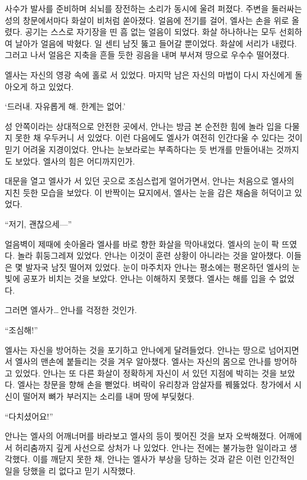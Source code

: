 사수가 발사를 준비하며 쇠뇌를 장전하는 소리가 동시에 울려 퍼졌다. 주변을 둘러싸는 성의 창문에서마다 화살이 비처럼 쏟아졌다. 얼음에 전기를 걸어, 엘사는 손을 위로 올렸다. 공기는 스스로 자기장을 띤 흠 없는 얼음이 되었다. 화살 하나하나는 모두 선회하여 날아가 얼음에 박혔다. 일 센티 남짓 뚫고 들어갈 뿐이었다. 화살에 서리가 내렸다. 그러고 나서 얼음은 지축을 흔들 듯한 굉음을 내며 부서져 땅으로 우수수 떨어졌다.

엘사는 자신의 영광 속에 홀로 서 있었다. 마지막 남은 자신의 마법이 다시 자신에게 돌아오게 하고 있었다.

`드러내. 자유롭게 해. 한계는 없어.'

\textbreak

성 안쪽이라는 상대적으로 안전한 곳에서, 안나는 방금 본 순전한 힘에 놀라 입을 다물지 못한 채 우두커니 서 있었다. 이런 다음에도 엘사가 여전히 인간다울 수 있다는 것이 믿기 어려울 지경이었다. 안나는 눈보라로는 부족하다는 듯 번개를 만들어내는 것까지도 보았다. 엘사의 힘은 어디까지인가.

대문을 열고 엘사가 서 있던 곳으로 조심스럽게 얼어가면서, 안나는 처음으로 엘사의 지친 듯한 모습을 보았다. 이 반짝이는 묘지에서, 엘사는 눈을 감은 채숨을 허덕이고 있었다.

``저기, 괜찮으세—''

얼음벽이 제때에 솟아올라 엘사를 바로 향한 화살을 막아내었다. 엘사의 눈이 팍 뜨였다. 놀라 휘둥그레져 있었다. 안나는 이것이 훈련 상황이 아니라는 것을 알아챘다. 이들은 몇 발자국 남짓 떨어져 있었다. 눈이 마주치자 안나는 평소에는 평온하던 엘사의 눈빛에 공포가 비치는 것을 보았다. 안나는 이해하지 못했다. 엘사는 해를 입을 수 없었다.

그러면 엘사가\ldots\,안나를 걱정한 것인가.

``조심해!''

엘사는 자신을 방어하는 것을 포기하고 안나에게 달려들었다. 안나는 땅으로 넘어지면서 엘사의 맨손에 붙들리는 것을 겨우 알아챘다. 엘사는 자신의 몸으로 안나를 방어하고 있었다. 안나는 또 다른 화살이 정확하게 자신이 서 있던 지점에 박히는 것을 보았다. 엘사는 창문을 향해 손을 뻗었다. 벼락이 유리창과 암살자를 꿰뚫었다. 창가에서 시신이 떨어져 뼈가 부러지는 소리를 내며 땅에 부딪혔다.

``다치셨어요!''

안나는 엘사의 어깨너머를 바라보고 엘사의 등이 찢어진 것을 보자 오싹해졌다. 어깨에서 허리춤까지 깊게 사선으로 상처가 나 있었다. 안나는 전에는 불가능한 일이라고 생각했다. 이를 깨닫지 못한 채, 안나는 엘사가 부상을 당하는 것과 같은 이런 인간적인 일을 당했을 리 없다고 믿기 시작했다.


